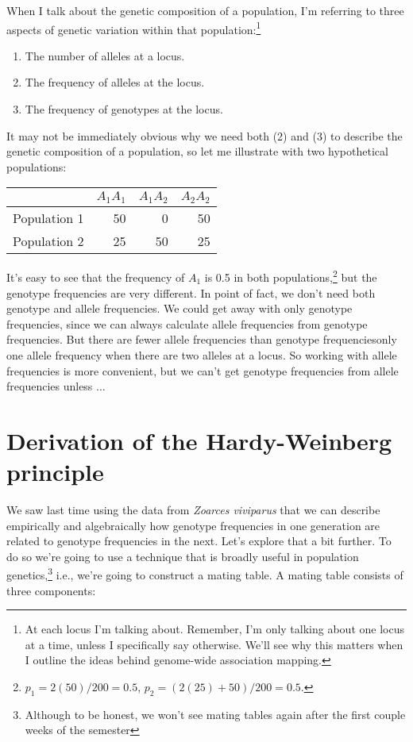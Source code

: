 When I talk about the genetic composition of a population, I'm
referring to three aspects of genetic variation within that
population:\footnote{At each locus I'm talking about. Remember, I'm
  only talking about one locus at a time, unless I specifically say
  otherwise. We'll see why this matters when I outline the ideas
  behind genome-wide association mapping.} 
\begin{enumerate}

\item The number of alleles at a locus.

\item The frequency of alleles at the locus.

\item The frequency of genotypes at the locus.

\end{enumerate}
It may not be immediately obvious why we need both (2) and
(3) to describe the genetic composition of a population, so let me
illustrate with two hypothetical populations:
\begin{center}
\begin{tabular}{lrrr}
             & $A_1A_1$ & $A_1A_2$ & $A_2A_2$ \\
\hline\hline
Population 1 &       50 &        0 &       50 \\
Population 2 &       25 &       50 &       25 \\
\hline
\end{tabular}
\end{center}
It's easy to see that the frequency of $A_1$ is 0.5 in both
populations,\footnote{$p_1 = 2(50)/200 = 0.5$,
  $p_2 = (2(25) + 50)/200 = 0.5$.} but the genotype frequencies are
very different. In point of fact, we don't need both genotype and
allele frequencies. We could get away with only genotype frequencies,
since we can always calculate allele frequencies from genotype
frequencies. But there are fewer allele frequencies than genotype
frequencies{\dash}only one allele frequency when there are two alleles
at a locus. So working with allele frequencies is more convenient, but
we can't get genotype frequencies from allele frequencies unless
$\dots$

\section*{Derivation of the Hardy-Weinberg principle}

We saw last time using the data from {\it Zoarces viviparus\/} that we
can describe empirically and algebraically how genotype frequencies in
one generation are related to genotype frequencies in the next. Let's
explore that a bit further. To do so we're going to use a technique
that is broadly useful in population genetics,\footnote{Although to be
  honest, we won't see mating tables again after the first couple
  weeks of the semester} i.e., we're going to
construct a mating table. A mating table consists of three
components:

